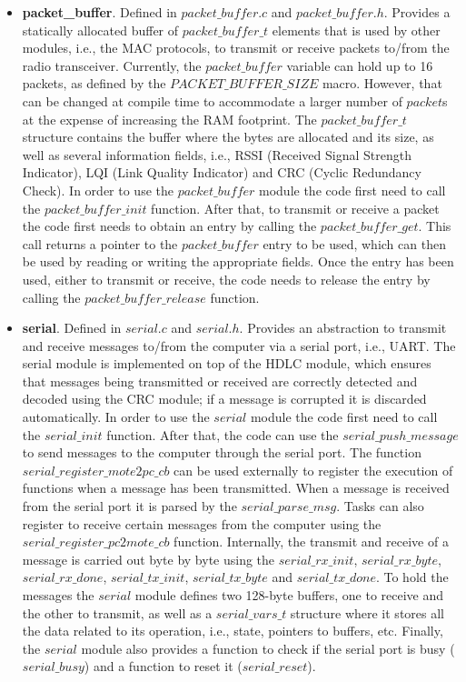 \begin{itemize}
\item \textbf{packet\_buffer}. Defined in $packet\_buffer.c$ and $packet\_buffer.h$. Provides a statically allocated buffer of $packet\_buffer\_t$ elements that is used by other modules, i.e., the MAC protocols, to transmit or receive packets to/from the radio transceiver. Currently, the $packet\_buffer$ variable can hold up to 16 packets, as defined by the $PACKET\_BUFFER\_SIZE$ macro. However, that can be changed at compile time to accommodate a larger number of $packet$s at the expense of increasing the RAM footprint. The $packet\_buffer\_t$ structure contains the buffer where the bytes are allocated and its size, as well as several information fields, i.e., RSSI (Received Signal Strength Indicator), LQI (Link Quality Indicator) and CRC (Cyclic Redundancy Check). In order to use the $packet\_buffer$ module the code first need to call the $packet\_buffer\_init$ function. After that, to transmit or receive a packet the code first needs to obtain an entry by calling the $packet\_buffer\_get$. This call returns a pointer to the $packet\_buffer$ entry to be used, which can then be used by reading or writing the appropriate fields. Once the entry has been used, either to transmit or receive, the code needs to release the entry by calling the $packet\_buffer\_release$ function. 

\item \textbf{serial}. Defined in $serial.c$ and $serial.h$. Provides an abstraction to transmit and receive messages to/from the computer via a serial port, i.e., UART. The serial module is implemented on top of the HDLC module, which ensures that messages being transmitted or received are correctly detected and decoded using the CRC module; if a message is corrupted it is discarded automatically. In order to use the $serial$ module the code first need to call the $serial\_init$ function. After that, the code can use the $serial\_push\_message$ to send messages to the computer through the serial port. The function $serial\_register\_mote2pc\_cb$ can be used externally to register the execution of functions when a message has been transmitted. When a message is received from the serial port it is parsed by the $serial\_parse\_msg$. Tasks can also register to receive certain messages from the computer using the $serial\_register\_pc2mote\_cb$ function. Internally, the transmit and receive of a message is carried out byte by byte using the $serial\_rx\_init$, $serial\_rx\_byte$, $serial\_rx\_done$, $serial\_tx\_init$, $serial\_tx\_byte$ and $serial\_tx\_done$. To hold the messages the $serial$ module defines two 128-byte buffers, one to receive and the other to transmit, as well as a $serial\_vars\_t$ structure where it stores all the data related to its operation, i.e., state, pointers to buffers, etc. Finally, the $serial$ module also provides a function to check if the serial port is busy ($serial\_busy$) and a function to reset it ($serial\_reset$).


\end{itemize}
